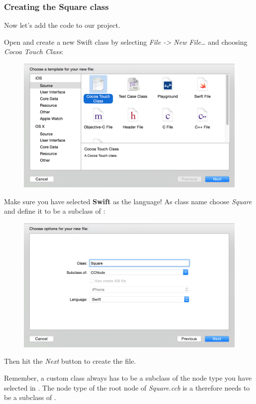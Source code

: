 \subsubsection{Creating the Square class}
Now let's add the code to our project.
\begin{leftbar}
Open \xcode{} and create a new Swift class by selecting \textit{File ->
New File\ldots} and choosing \textit{Cocoa Touch Class}: 
\begin{figure}[H]
    \centering
    \includegraphics[width=350pt]{images/Chapter1/new_cocoa_touch.png}
\end{figure}
Make sure you have selected \textbf{Swift} as the language!
As class name choose \textit{Square} and define it to be a subclass of
\ccnode{}:
\begin{figure}[H]
    \centering
    \includegraphics[width=350pt]{images/Chapter1/new_cocoa_touch_2.png}
\end{figure}
Then hit the \textit{Next} button to create the file.
\end{leftbar}

Remember, a custom class always has to be a subclass of the node type
you have selected in \SB{}. The node type of the root node of
\textit{Square.ccb} is a \ccnode{} therefore  needs to be a subclass of \ccnode{}.

